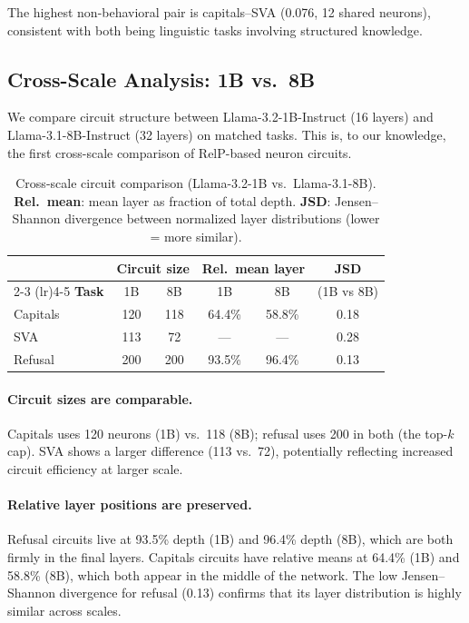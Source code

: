 \documentclass[11pt]{article}
\begin{document}
The highest non-behavioral pair is capitals--SVA (0.076, 12 shared neurons), consistent with both being linguistic tasks involving structured knowledge.


\subsection{Cross-Scale Analysis: 1B vs.\ 8B}
\label{sec:cross_scale}

We compare circuit structure between Llama-3.2-1B-Instruct (16 layers) and Llama-3.1-8B-Instruct (32 layers) on matched tasks.
This is, to our knowledge, the first cross-scale comparison of RelP-based neuron circuits.

\begin{table}[h]
\centering
\caption{Cross-scale circuit comparison (Llama-3.2-1B vs.\ Llama-3.1-8B). \textbf{Rel.\ mean}: mean layer as fraction of total depth. \textbf{JSD}: Jensen--Shannon divergence between normalized layer distributions (lower = more similar).}
\label{tab:cross_scale}
\small
\begin{tabular}{lccccc}
\toprule
& \multicolumn{2}{c}{\textbf{Circuit size}} & \multicolumn{2}{c}{\textbf{Rel.\ mean layer}} & \textbf{JSD} \\
\cmidrule(lr){2-3} \cmidrule(lr){4-5}
\textbf{Task} & 1B & 8B & 1B & 8B & (1B vs 8B) \\
\midrule
Capitals & 120 & 118 & 64.4\% & 58.8\% & 0.18 \\
SVA      & 113 &  72 & ---    & ---    & 0.28 \\
Refusal  & 200 & 200 & 93.5\% & 96.4\% & 0.13 \\
\bottomrule
\end{tabular}
\end{table}

\paragraph{Circuit sizes are comparable.}
Capitals uses 120 neurons (1B) vs.\ 118 (8B); refusal uses 200 in both (the top-$k$ cap).
SVA shows a larger difference (113 vs.\ 72), potentially reflecting increased circuit efficiency at larger scale.

\paragraph{Relative layer positions are preserved.}
Refusal circuits live at 93.5\% depth (1B) and 96.4\% depth (8B), which are both firmly in the final layers.
Capitals circuits have relative means at 64.4\% (1B) and 58.8\% (8B), which both appear in the middle of the network.
The low Jensen--Shannon divergence for refusal (0.13) confirms that its layer distribution is highly similar across scales.
\end{document}
